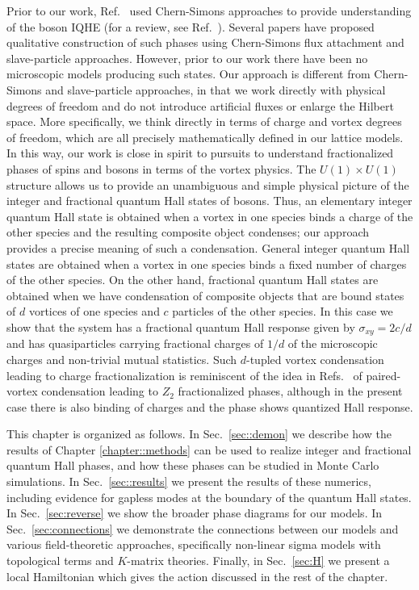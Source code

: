 Prior to our work, Ref.~\cite{LuVishwanath2012} used Chern-Simons approaches to provide understanding of the boson IQHE (for a review, see Ref.~\cite{TurnerVishwanath2013}).  Several papers have proposed qualitative construction of such phases using Chern-Simons flux attachment\cite{SenthilLevin2012} and slave-particle approaches.\cite{GroverVishwanath2012, LuLee2012_QPT, LuLee2012_S1}  However, prior to our work there have been no microscopic models producing such states.
Our approach is different from Chern-Simons and slave-particle approaches, in that we work directly with physical degrees of freedom and do not introduce artificial fluxes or enlarge the Hilbert space.  More specifically, we think directly in terms of charge and vortex degrees of freedom, which are all precisely mathematically defined in our lattice models.  In this way, our work is close in spirit to pursuits to understand fractionalized phases of spins and bosons in terms of the vortex physics.\cite{BalentsFisherNayak1999, SenthilFisher_Z2}  The $U(1) \times U(1)$ structure allows us to provide an unambiguous and simple physical picture of the integer and fractional quantum Hall states of bosons.  Thus, an elementary integer quantum Hall state is obtained when a vortex in one species binds a charge of the other species and the resulting composite object condenses; our approach provides a precise meaning of such a condensation.  General integer quantum Hall states are obtained when a vortex in one species binds a fixed number of charges of the other species.  On the other hand, fractional quantum Hall states are obtained when we have condensation of composite objects that are bound states of $d$ vortices of one species and $c$ particles of the other species.  In this case we show that the system has a fractional quantum Hall response given by $\sigma_{xy} = 2c/d$ and has quasiparticles carrying fractional charges of $1/d$ of the microscopic charges and non-trivial mutual statistics.  Such $d$-tupled vortex condensation leading to charge fractionalization is reminiscent of the idea in Refs.~\cite{BalentsFisherNayak1999, SenthilFisher_Z2} of paired-vortex condensation leading to $Z_2$ fractionalized phases, although in the present case there is also binding of charges and the phase shows quantized Hall response.

This chapter is organized as follows.  In Sec.~\ref{sec::demon} we describe how the results of Chapter \ref{chapter::methods} can be used to realize integer and fractional quantum Hall phases, and how these phases can be studied in Monte Carlo simulations.  In Sec.~\ref{sec::results} we present the results of these numerics, including evidence for gapless modes at the boundary of the quantum Hall states.  In Sec.~\ref{sec:reverse} we show the broader phase diagrams for our models.  In Sec.~\ref{sec:connections} we demonstrate the connections between our models and various field-theoretic approaches, specifically non-linear sigma models with topological terms and $K$-matrix theories.  Finally, in Sec.~\ref{sec:H} we present a local Hamiltonian which gives the action discussed in the rest of the chapter.


